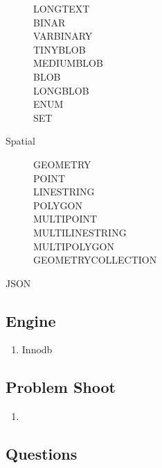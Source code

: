 \begin{description}
{\begin{description}
        	\item[LONGTEXT]
        	\item[BINAR]
        	\item[VARBINARY]
        	\item[TINYBLOB]
        	\item[MEDIUMBLOB]
        	\item[BLOB]
        	\item[LONGBLOB]
        	\item[ENUM]
        	\item[SET]
        	\end{description}
        }
        \item[Spatial]{
        	\begin{description}
        	\item[GEOMETRY]
        	\item[POINT]
        	\item[LINESTRING]
        	\item[POLYGON]
        	\item[MULTIPOINT]
        	\item[MULTILINESTRING]
        	\item[MULTIPOLYGON]
        	\item[GEOMETRYCOLLECTION]
        	\end{description}
        }
        \item[JSON]
    \end{description}

    \subsection{Engine}
    \begin{enumerate}
        \item Innodb
    \end{enumerate}
    
    \subsection{Problem Shoot}
    \begin{enumerate}
        \item 
    \end{enumerate}
    
    
    
    \subsection{Questions}
    